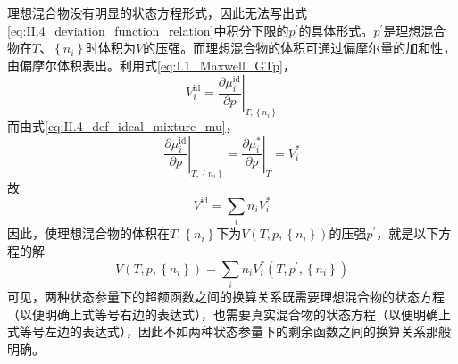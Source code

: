 \documentclass[main.tex]{subfiles}
\begin{document}
理想混合物没有明显的状态方程形式，因此无法写出式\eqref{eq:II.4_deviation_function_relation}中积分下限的$p^\prime$的具体形式。$p^\prime$是理想混合物在$T$、$\left\{n_i\right\}$时体积为$V$的压强。而理想混合物的体积可通过偏摩尔量的加和性，由偏摩尔体积表出。利用式\eqref{eq:I.1_Maxwell_GTp}，
\[V_i^\text{id}=\left.\frac{\partial \mu_i^\text{id}}{\partial p}\right|_{T,\left\{n_i\right\}}\]
而由式\eqref{eq:II.4_def_ideal_mixture_mu}，
\[\left.\frac{\partial \mu_i^\text{id}}{\partial p}\right|_{T,\left\{n_i\right\}}=\left.\frac{\partial\mu^*_i}{\partial p}\right|_T=V_i^*\]
故
\[V^\text{id}=\sum_in_iV_i^*\]
因此，使理想混合物的体积在$T,\left\{n_i\right\}$下为$V\left(T,p,\left\{n_i\right\}\right)$的压强$p^\prime$，就是以下方程的解
\[V\left(T,p,\left\{n_i\right\}\right)=\sum_in_iV_i^*\left(T,p^\prime,\left\{n_i\right\}\right)\]
可见，两种状态参量下的超额函数之间的换算关系既需要理想混合物的状态方程（以便明确上式等号右边的表达式），也需要真实混合物的状态方程（以便明确上式等号左边的表达式），因此不如两种状态参量下的剩余函数之间的换算关系那般明确。
\end{document}
